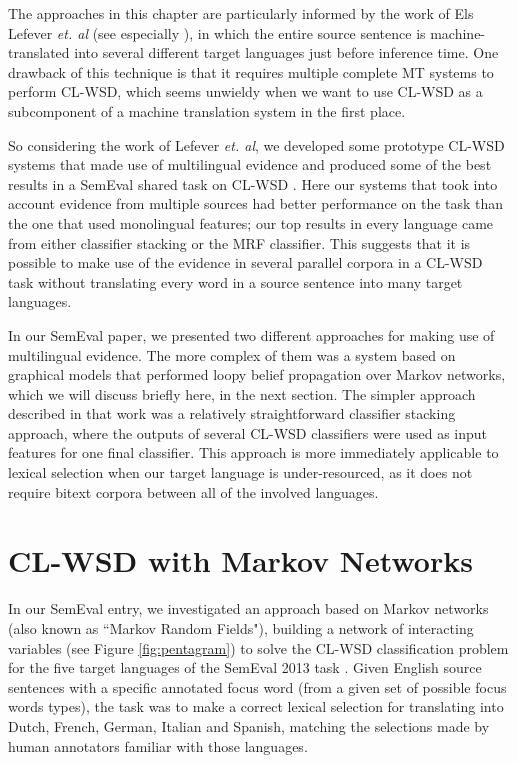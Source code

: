 The approaches in this chapter are particularly informed by the work of Els
Lefever \emph{et. al} (see especially
\cite{lefever-hoste-decock:2011:ACL-HLT2011}), in which the entire source
sentence is machine-translated into several different target languages just
before inference time. One drawback of this technique is that it requires
multiple complete MT systems to perform CL-WSD, which seems unwieldy when we
want to use CL-WSD as a subcomponent of a machine translation system in the
first place.

So considering the work of Lefever \emph{et. al}, we developed some prototype
CL-WSD systems that made use of multilingual evidence
\cite{rudnick-liu-gasser:2013:SemEval-2013} and produced some of the best
results in a SemEval shared task on CL-WSD \cite{task10}.
Here our systems that took into account evidence from multiple sources had
better performance on the task than the one that used monolingual features; our
top results in every language came from either classifier stacking or the MRF
classifier. This suggests that it is possible to make use of the evidence in
several parallel corpora in a CL-WSD task without translating every word in a
source sentence into many target languages.

In our SemEval paper, we presented two different approaches for
making use of multilingual evidence. The more complex of them was a system
based on graphical models that performed loopy belief propagation over Markov
networks, which we will discuss briefly here, in the next section.
The simpler approach described in that work was a relatively straightforward
classifier stacking approach, where the outputs of several CL-WSD classifiers
were used as input features for one final classifier. This approach is more
immediately applicable to lexical selection when our target language is
under-resourced, as it does not require bitext corpora between all of the
involved languages.

\section{CL-WSD with Markov Networks}
In our SemEval entry, we investigated an approach based on Markov networks
(also known as ``Markov Random Fields"), building a network of interacting
variables (see Figure \ref{fig:pentagram}) to solve the CL-WSD classification
problem for the five target languages of the SemEval 2013 task \cite{task10}.
Given English source sentences with a specific annotated focus word (from a
given set of possible focus words types), the task was to make a correct
lexical selection for translating into Dutch, French, German, Italian and
Spanish, matching the selections made by human annotators familiar with those
languages.

